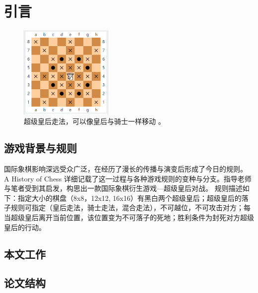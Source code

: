 \chapter{引言}
\label{chap:introduction}

\begin{figure}[htb]
    \centering
    \includegraphics[width=0.4\textwidth]{amazon.PNG}
    \caption[超级皇后]{%
      超级皇后走法，可以像皇后与骑士一样移动%
      \cite{wikiAmazon}。}
    \label{fig:superQueen}
  \end{figure}

\section{游戏背景与规则}
国际象棋影响深远受众广泛，在经历了漫长的传播与演变后形成了今日的规则。
A History of Chess 详细记载了这一过程与各种游戏规则的变种与分支\cite{murray2015history}。指导老师与笔者受到其启发，构思出一款国际象棋衍生游戏—超级皇后对战。
规则描述如下：指定大小的棋盘（8x8，12x12, 16x16）有黑白两个超级皇后；超级皇后的落子规则可指定（皇后走法，骑士走法，混合走法），不可越位，不可攻击对方；每当超级皇后离开当前位置，该位置变为不可落子的死地；胜利条件为封死对方超级皇后的行动。


\section{本文工作}

\section{论文结构}


